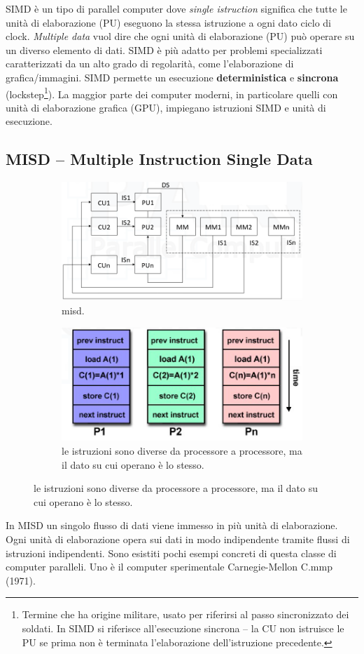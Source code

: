 SIMD è un tipo di parallel computer dove \textit{single istruction} significa che tutte le unità di elaborazione (PU) eseguono la stessa istruzione a ogni dato ciclo di clock. \textit{Multiple data} vuol dire che ogni unità di elaborazione (PU) può operare su un diverso elemento di dati. SIMD è più adatto per problemi specializzati
caratterizzati da un alto grado di
regolarità, come l'elaborazione di grafica/immagini. SIMD permette un esecuzione \textbf{deterministica} e \textbf{sincrona} (lockstep\footnote{Termine che ha origine militare, usato per riferirsi al passo sincronizzato dei soldati. In SIMD si riferisce all'esecuzione sincrona -- la CU non istruisce le PU se prima non è terminata l'elaborazione dell'istruzione precedente.}). La maggior parte dei computer moderni, in particolare quelli con unità di elaborazione grafica (GPU), impiegano istruzioni SIMD e unità di esecuzione.
\subsection*{MISD -- Multiple Instruction Single Data}

\begin{figure}[th]
	
	\begin{subfigure}{0.45\linewidth}
		\centering
		\includegraphics[width=\linewidth]{img/misd}
		\caption{misd.}
		\label{fig:misd}
	\end{subfigure}
	\hfill
	\begin{subfigure}{0.45\linewidth}
			\centering
		\includegraphics[width=0.7\linewidth]{img/misd-processori}
		\caption{le istruzioni sono diverse da processore a processore, ma il dato su cui operano è lo stesso.}
		\label{fig:misd-processori}		
	\end{subfigure}
\end{figure}
In MISD un singolo flusso di dati viene immesso in più unità di elaborazione. Ogni unità di elaborazione opera sui dati in modo indipendente tramite flussi di istruzioni indipendenti. Sono esistiti pochi esempi concreti di questa classe di computer paralleli. Uno è il computer sperimentale Carnegie-Mellon C.mmp (1971).

